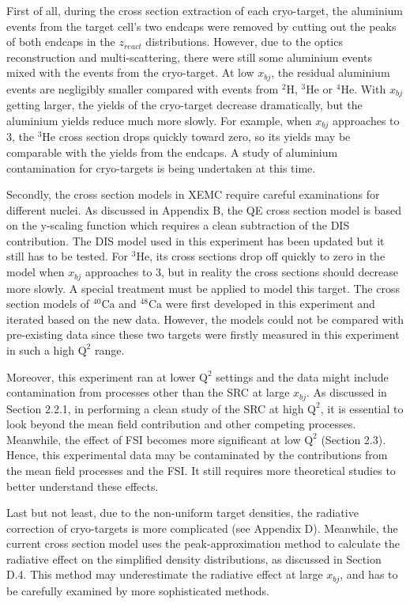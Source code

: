    First of all, during the cross section extraction of each cryo-target, the aluminium events from the target cell's two endcaps were removed by cutting out the peaks of both endcaps in the $z_{react}$ distributions. However, due to the optics reconstruction and multi-scattering, there were still some aluminium events mixed with the events from the cryo-target. At low $x_{bj}$, the residual aluminium events are negligibly smaller compared with events from $\mathrm{^{2}H}$, $\mathrm{^{3}He}$ or $\mathrm{^{4}He}$. With $x_{bj}$ getting larger, the yields of the cryo-target decrease dramatically, but the aluminium yields reduce much more slowly. For example, when $x_{bj}$ approaches to 3, the $\mathrm{^{3}He}$ cross section drops quickly toward zero, so its yields may be comparable with the yields from the endcaps. A study of aluminium contamination for cryo-targets is being undertaken at this time.
  
 Secondly, the cross section models in XEMC require careful examinations for different nuclei.  As discussed in Appendix B, the QE cross section model is based on the y-scaling function which requires a clean subtraction of the DIS contribution. The DIS model used in this experiment has been updated but it still has to be tested. For $\mathrm{^{3}He}$, its cross sections drop off quickly to zero in the model when $x_{bj}$ approaches to 3, but in reality the cross sections should decrease more slowly. A special treatment must be applied to model this target. The cross section models of $\mathrm{^{40}Ca}$ and $\mathrm{^{48}Ca}$ were first developed in this experiment and iterated based on the new data. However, the models could not be compared with pre-existing data since these two targets were firstly measured in this experiment in such a high $\mathrm{Q^{2}}$ range. 
 
 Moreover, this experiment ran at lower $\mathrm{Q^{2}}$ settings and the data might include contamination from processes other than the SRC at large $x_{bj}$. As discussed in Section 2.2.1, in performing a clean study of the SRC at high $\mathrm{Q^{2}}$, it is essential to look beyond the mean field contribution and other competing processes. Meanwhile, the effect of FSI becomes more significant at low $\mathrm{Q^{2}}$ (Section 2.3). Hence, this experimental data may be contaminated by the contributions from the mean field processes and the FSI. It still requires more theoretical studies to better understand these effects.
  
 Last but not least, due to the non-uniform target densities, the radiative correction of cryo-targets is more complicated (see Appendix D). Meanwhile, the current cross section model uses the peak-approximation method to calculate the radiative effect on the simplified density distributions, as discussed in Section D.4. This method may underestimate the radiative effect at large $x_{bj}$, and has to be carefully examined by more sophisticated methods. 

